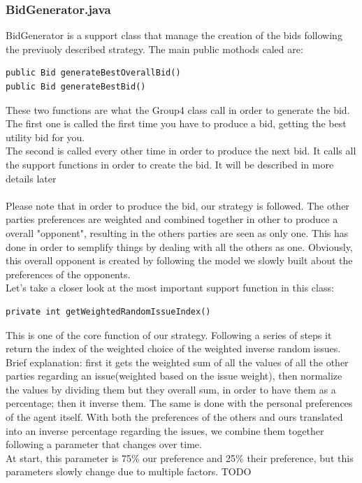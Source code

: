 \documentclass[a4,11pt]{scrartcl}
\begin{document}
\subsubsection{BidGenerator.java}
BidGenerator is a support class that manage the creation of the bids following the previuoly described strategy. 
The main public mothods caled are:
\begin{lstlisting}
public Bid generateBestOverallBid()
public Bid generateBestBid()
\end{lstlisting}
These two functions are what the Group4 class call in order to generate the bid.\\ The first one is called the first time you have to produce a bid, getting the best utility bid for you. \\The second is called every other time in order to produce the next bid. It calls 
all the support functions in order to create the bid. It will be described in more details later\\ \\
Please note that in order to produce the bid, our strategy is followed. The other parties preferences are weighted and combined together in other to produce a overall "opponent", resulting in the others parties are seen as only one. This has done in order to semplify things by dealing with all the others as one. Obviously, this overall opponent is created by following the model we slowly built about the preferences  of the opponents.  \\ 
Let's take a closer look at the most important support function in this class:
\begin{lstlisting}
private int getWeightedRandomIssueIndex()
\end{lstlisting}
This is one of the core function of our strategy. Following a series of steps it return the index of the weighted choice of the weighted inverse random issues.\\ Brief explanation: first it gets the weighted sum of all the values of all the other parties regarding an issue(weighted based on the issue weight),  then normalize the values by dividing  them but they overall sum, in order to have them as a percentage; then it inverse them. The same is done with the personal preferences of the agent itself. With both the preferences of the others and ours translated into an inverse percentage regarding the issues, we combine them together following a parameter that changes over time. \\At start, this parameter is 75\% our preference and 25\%  their preference, but this parameters slowly change due to multiple factors. TODO 
\end{document}
